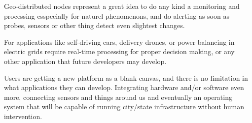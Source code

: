 Geo-distributed nodes represent a great idea to do any kind a monitoring and processing esspecially for naturel phenomenons, and do alerting as soon as probes, sensors or other thing detect even slightest changes.

For applications like self-driving cars, delivery drones, or power balancing in electric grids require real-time processing for proper decision making, or any other application that future developers may develop.

Users are getting a new platform as a blank canvas, and there is no limitation in what applications they can develop. Integrating hardware and/or software even more, connecting sensors and things around us and eventually an operating system that will be capable of running city/state infrastructure without human intervention.
%
%